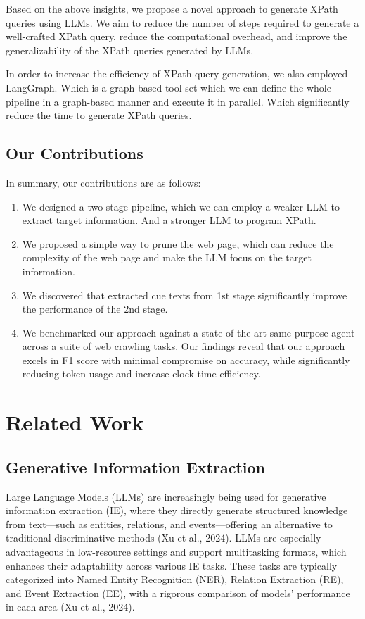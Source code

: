 \documentclass[a4paper]{article}
\begin{document}
Based on the above insights, we propose a novel approach to generate XPath queries using LLMs. We aim to reduce the number of steps required to generate a well-crafted XPath query, reduce the computational overhead, and improve the generalizability of the XPath queries generated by LLMs.

In order to increase the efficiency of XPath query generation, we also employed LangGraph. Which is a graph-based tool set which we can define the whole pipeline in a graph-based manner and execute it in parallel. Which significantly reduce the time to generate XPath queries.

\subsection{Our Contributions}

In summary, our contributions are as follows:

\begin{enumerate}
  \item We designed a two stage pipeline, which we can employ a weaker LLM to extract target information. And a stronger LLM to program XPath.
  \item We proposed a simple way to prune the web page, which can reduce the complexity of the web page and make the LLM focus on the target information.
  \item We discovered that extracted cue texts from 1st stage significantly improve the performance of the 2nd stage.
  \item We benchmarked our approach against a state-of-the-art same purpose agent across a suite of web crawling tasks. Our findings reveal that our approach excels in F1 score with minimal compromise on accuracy, while significantly reducing token usage and increase clock-time efficiency.
\end{enumerate}

\section{Related Work}
\subsection{Generative Information Extraction}

Large Language Models (LLMs) are increasingly being used for generative information extraction (IE), where they directly generate structured knowledge from text—such as entities, relations, and events—offering an alternative to traditional discriminative methods (Xu et al., 2024). LLMs are especially advantageous in low-resource settings and support multitasking formats, which enhances their adaptability across various IE tasks. These tasks are typically categorized into Named Entity Recognition (NER), Relation Extraction (RE), and Event Extraction (EE), with a rigorous comparison of models’ performance in each area (Xu et al., 2024).
\end{document}
